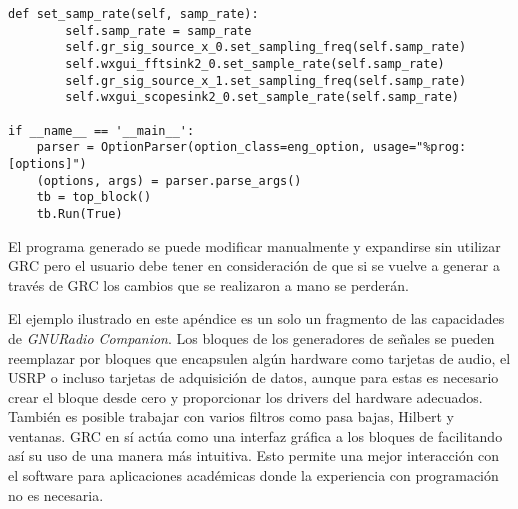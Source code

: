 \begin{lstlisting}[float=hp, label=ex:grcpython, caption={C\'odigo \emph{Python} generado por GRC}, breaklines=true]
	def set_samp_rate(self, samp_rate):
		self.samp_rate = samp_rate
		self.gr_sig_source_x_0.set_sampling_freq(self.samp_rate)
		self.wxgui_fftsink2_0.set_sample_rate(self.samp_rate)
		self.gr_sig_source_x_1.set_sampling_freq(self.samp_rate)
		self.wxgui_scopesink2_0.set_sample_rate(self.samp_rate)

if __name__ == '__main__':
	parser = OptionParser(option_class=eng_option, usage="%prog: [options]")
	(options, args) = parser.parse_args()
	tb = top_block()
	tb.Run(True)
\end{lstlisting}

El programa generado se puede modificar manualmente y expandirse sin utilizar GRC pero el usuario debe tener en consideraci\'on de
que si se vuelve a generar a trav\'es de GRC los cambios que se realizaron a mano se perder\'an.

El ejemplo ilustrado en este ap\'endice es un solo un fragmento de las capacidades de
\emph{GNURadio Companion}. Los bloques de los generadores de se\~nales se pueden reemplazar por
bloques que encapsulen alg\'un hardware como tarjetas de audio, el USRP o incluso tarjetas de
adquisici\'on de datos, aunque para estas es necesario crear el bloque desde cero y proporcionar los
drivers del hardware adecuados. Tambi\'en es posible trabajar con varios filtros como pasa bajas,
Hilbert y ventanas. GRC en s\'i act\'ua como una interfaz gr\'afica a los bloques de \gnuradio
facilitando as\'i su uso de una manera m\'as intuitiva. Esto permite una mejor interacci\'on con el
software para aplicaciones acad\'emicas donde la experiencia con programaci\'on no es necesaria.
